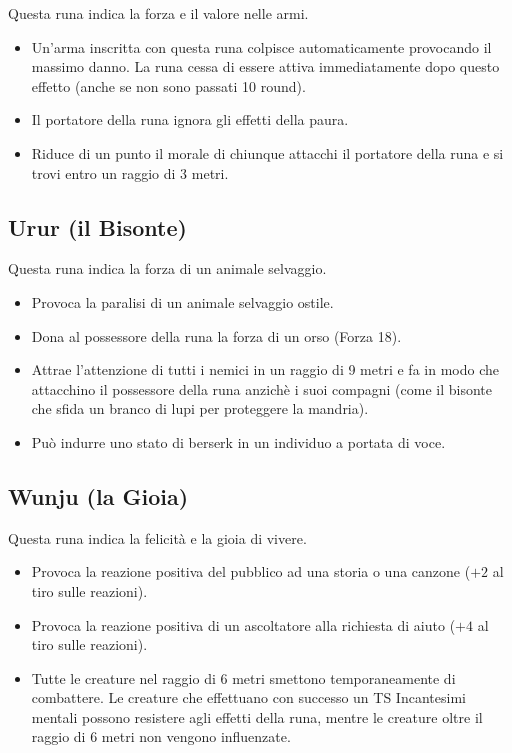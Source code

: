 \documentclass[10pt,a4paper]{article}
\begin{document}
Questa runa indica la forza e il valore nelle armi.
 \begin{itemize}
\item       Un'arma inscritta con questa runa colpisce automaticamente provocando il massimo danno. La runa cessa di essere attiva immediatamente dopo questo effetto (anche se non sono passati 10 round).
 
\item       Il portatore della runa ignora gli effetti della paura.
 
\item        Riduce di un punto il morale di chiunque attacchi il portatore della runa e si trovi entro un raggio di 3 metri.
 \end{itemize}
 
 
\subsection*{Urur (il Bisonte)}
 
Questa runa indica la forza di un animale selvaggio.
 \begin{itemize}
\item       Provoca la paralisi di un animale selvaggio ostile.
 
\item       Dona al possessore della runa la forza di un orso (Forza 18).
 
\item       Attrae l'attenzione di tutti i nemici in un raggio di 9 metri e fa in modo che attacchino il possessore della runa anzich\`{e} i suoi compagni (come il bisonte che sfida un branco di lupi per proteggere la mandria).

\item		Pu\`{o} indurre uno stato di berserk in un individuo a portata di voce.
 \end{itemize}
 
 
\subsection*{Wunju (la Gioia)}
 
Questa runa indica la felicit\`{a} e la gioia di vivere.
  \begin{itemize}
\item       Provoca la reazione positiva del pubblico ad una storia o una canzone ($+2$ al tiro sulle reazioni).
 
\item       Provoca la reazione positiva di un ascoltatore alla richiesta di aiuto ($+4$ al tiro sulle reazioni).
 
\item       Tutte le creature nel raggio di 6 metri smettono temporaneamente di combattere. Le creature che effettuano con successo un TS Incantesimi mentali possono resistere agli effetti della runa, mentre le creature oltre il raggio di 6 metri non vengono influenzate.
\end{itemize}
\end{document}
